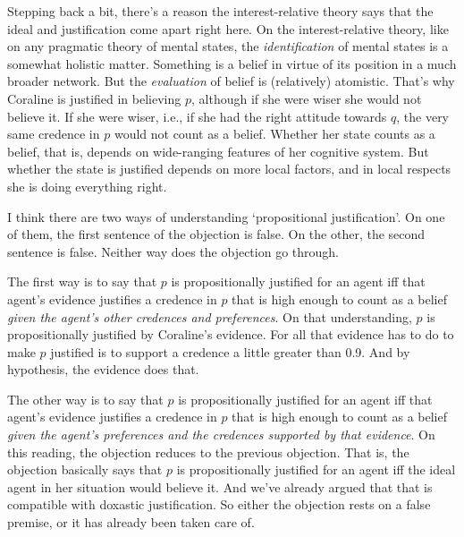{Stepping back a bit, there's a reason the interest-relative theory says that the ideal and justification come apart right here. On the interest-relative theory, like on any pragmatic theory of mental states, the \textit{identification} of mental states is a somewhat holistic matter. Something is a belief in virtue of its position in a much broader network. But the \textit{evaluation} of belief is (relatively) atomistic. That's why Coraline is justified in believing \(p\), although if she were wiser she would not believe it. If she were wiser, i.e., if she had the right attitude towards \(q\), the very same credence in \(p\) would not count as a belief. Whether her state counts as a belief, that is, depends on wide-ranging features of her cognitive system. But whether the state is justified depends on more local factors, and in local respects she is doing everything right.}

{I think there are two ways of understanding `propositional justification'. On one of them, the first sentence of the objection is false. On the other, the second sentence is false. Neither way does the objection go through.

The first way is to say that \(p\) is propositionally justified for an agent iff that agent's evidence justifies a credence in \(p\) that is high enough to count as a belief \textit{given the agent's other credences and preferences}. On that understanding, \(p\) is propositionally justified by Coraline's evidence. For all that evidence has to do to make \(p\) justified is to support a credence a little greater than 0.9. And by hypothesis, the evidence does that.

The other way is to say that \(p\) is propositionally justified for an agent iff that agent's evidence justifies a credence in \(p\) that is high enough to count as a belief \textit{given the agent's preferences and the credences supported by that evidence}. On this reading, the objection reduces to the previous objection. That is, the objection basically says that \(p\) is propositionally justified for an agent iff the ideal agent in her situation would believe it. And we've already argued that that is compatible with doxastic justification. So either the objection rests on a false premise, or it has already been taken care of.}

